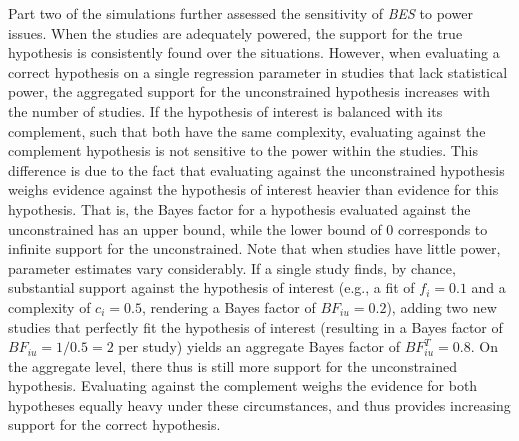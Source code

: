 \documentclass[
]{interact}
\begin{document}
                    Part two of the simulations further assessed the sensitivity of
                    \emph{BES} to power issues. When the studies are adequately powered, the
                    support for the true hypothesis is consistently found over the
                    situations. However, when evaluating a correct hypothesis on a single
                    regression parameter in studies that lack statistical power, the
                    aggregated support for the unconstrained hypothesis increases with the
                    number of studies. If the hypothesis of interest is balanced with its
                    complement, such that both have the same complexity, evaluating against
                    the complement hypothesis is not sensitive to the power within the
                    studies. This difference is due to the fact that evaluating against the
                    unconstrained hypothesis weighs evidence against the hypothesis of
                    interest heavier than evidence for this hypothesis. That is, the Bayes
                    factor for a hypothesis evaluated against the unconstrained has an upper
                    bound, while the lower bound of \(0\) corresponds to infinite support
                    for the unconstrained. Note that when studies have little power,
                    parameter estimates vary considerably. If a single study finds, by
                    chance, substantial support against the hypothesis of interest (e.g., a
                                                                                    fit of \(f_i=0.1\) and a complexity of \(c_i=0.5\), rendering a Bayes
                                                                                    factor of \(BF_{iu}=0.2\)), adding two new studies that perfectly fit
                    the hypothesis of interest (resulting in a Bayes factor of
                                                \(BF_{iu}=1/0.5=2\) per study) yields an aggregate Bayes factor of
                    \(BF^T_{iu}=0.8\). On the aggregate level, there thus is still more
                    support for the unconstrained hypothesis. Evaluating against the
                    complement weighs the evidence for both hypotheses equally heavy under
                    these circumstances, and thus provides increasing support for the
                    correct hypothesis.
                    
\end{document}
